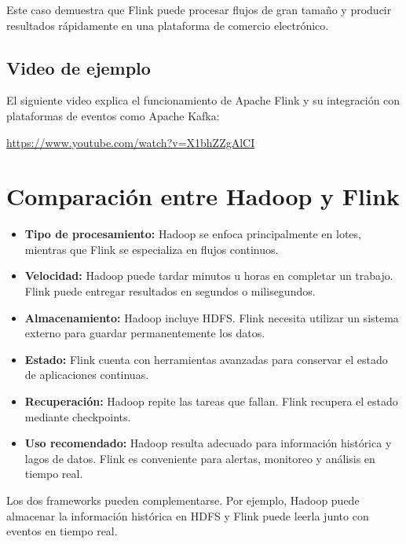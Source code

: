 Este caso demuestra que Flink puede procesar flujos de gran tamaño y producir
resultados rápidamente en una plataforma de comercio electrónico.

\subsection{Video de ejemplo}

El siguiente video explica el funcionamiento de Apache Flink y su integración
con plataformas de eventos como Apache Kafka:

\url{https://www.youtube.com/watch?v=X1bhZZgAlCI}


\section{Comparación entre Hadoop y Flink}

\begin{itemize}
    \item \textbf{Tipo de procesamiento:} Hadoop se enfoca principalmente en
    lotes, mientras que Flink se especializa en flujos continuos.
    
    \item \textbf{Velocidad:} Hadoop puede tardar minutos u horas en completar
    un trabajo. Flink puede entregar resultados en segundos o milisegundos.
    
    \item \textbf{Almacenamiento:} Hadoop incluye HDFS. Flink necesita utilizar
    un sistema externo para guardar permanentemente los datos.
    
    \item \textbf{Estado:} Flink cuenta con herramientas avanzadas para
    conservar el estado de aplicaciones continuas.
    
    \item \textbf{Recuperación:} Hadoop repite las tareas que fallan. Flink
    recupera el estado mediante checkpoints.
    
    \item \textbf{Uso recomendado:} Hadoop resulta adecuado para información
    histórica y lagos de datos. Flink es conveniente para alertas, monitoreo y
    análisis en tiempo real.
\end{itemize}

Los dos frameworks pueden complementarse. Por ejemplo, Hadoop puede almacenar
la información histórica en HDFS y Flink puede leerla junto con eventos en
tiempo real.

